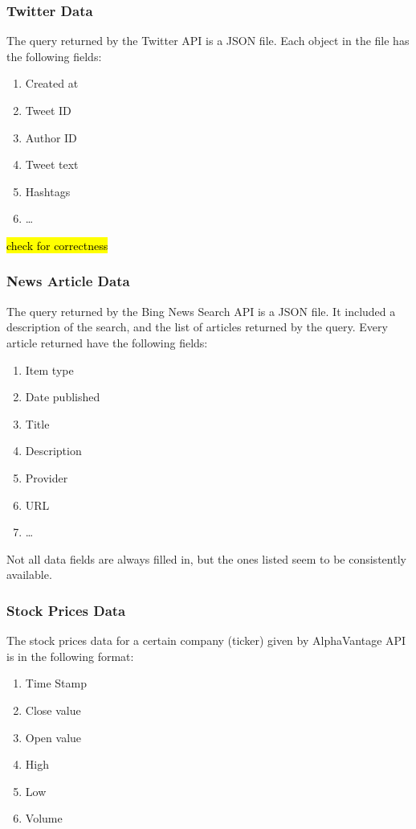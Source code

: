 \documentclass[sigconf, nonacm]{acmart}
\begin{document}
\subsubsection{Twitter Data}
The query returned by the Twitter API is a JSON file. Each object in the file has the following fields:

\begin{enumerate}
    \item Created at
    \item Tweet ID
    \item Author ID
    \item Tweet text
    \item Hashtags
    \item \dots
\end{enumerate}

\hl{check for correctness}


\subsubsection{News Article Data}
The query returned by the Bing News Search API is a JSON file. It included a description of the search, and the list of articles returned by the query. Every article returned have the following fields:

\begin{enumerate}
    \item Item type
    \item Date published
    \item Title
    \item Description
    \item Provider
    \item URL
    \item \dots
\end{enumerate}

Not all data fields are always filled in, but the ones listed seem to be consistently available.

\subsubsection{Stock Prices Data}
The stock prices data for a certain company (ticker) given by AlphaVantage API is in the following format:

\begin{enumerate}
    \item Time Stamp
    \item Close value
    \item Open value
    \item High
    \item Low
    \item Volume
\end{enumerate}
\end{document}
